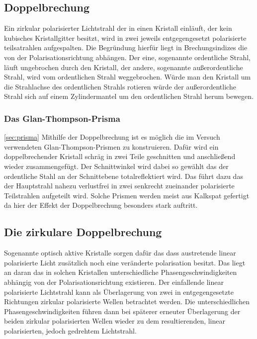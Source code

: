 \subsection{Doppelbrechung}
\label{sec:doppelbrechung}
Ein zirkular polarisierter Lichtstrahl der in einen Kristall einläuft, der kein kubisches Kristallgitter 
besitzt, wird in zwei jeweils entgegengesetzt polarisierte teilsatrahlen aufgespalten. Die Begründung hierfür
liegt in Brechungsindizes die von der Polarisationsrichtung abhängen. Der eine, sogenannte ordentliche Strahl,
läuft ungebrochen durch den Kristall, der andere, sogenannte außerordentliche Strahl, wird vom ordentlichen
Strahl weggebrochen. Würde man den Kristall um die Strahlachse des ordentlichen Strahls rotieren würde der
außerordentliche Strahl sich auf einem Zylindermantel um den ordentlichen Strahl herum bewegen.
\subsubsection{Das Glan-Thompson-Prisma}
\autoref{sec:prisma}
Mithilfe der Doppelbrechung ist es möglich die im Versuch verwendeten Glan-Thompson-Prismen zu konstruieren.
Dafür wird ein doppelbrechender Kristall schräg in zwei Teile geschnitten und anschließend wieder zusammengefügt.
Der Schnittwinkel wird dabei so gewählt das der ordentliche Stahl an der Schnittebene totalreflektiert wird.
Das führt dazu das der Hauptstrahl nahezu verlustfrei in zwei senkrecht zueinander polarisierte Teilstrahlen 
aufgeteilt wird. Solche Prismen werden meist aus Kalkspat gefertigt da hier der Effekt der Doppelbrechung besonders
stark auftritt.
\subsection{Die zirkulare Doppelbrechung}
\label{sec:zdoppelbrechung}
Sogenannte optisch aktive Kristalle sorgen dafür das dass austretende linear polarisierte Licht zusätzlich noch 
eine veränderte polarisation besitzt. Das liegt an daran das in solchen Kristallen unterschiedliche Phasengeschwindigkeiten
abhängig von der Polarisationsrichtung existieren. Der einfallende linear polarisierte Lichtstrahl kann als Überlagerung von 
zwei in entgegengesetzte Richtungen zirkular polarisierte Wellen betrachtet werden. Die unterschiedlichen 
Phasengeschwindigkeiten führen dann bei späterer erneuter Überlagerung der beiden zirkular polarisierten Wellen wieder
zu dem resultierenden, linear polarisierten, jedoch gedrehtem Lichtstrahl.

